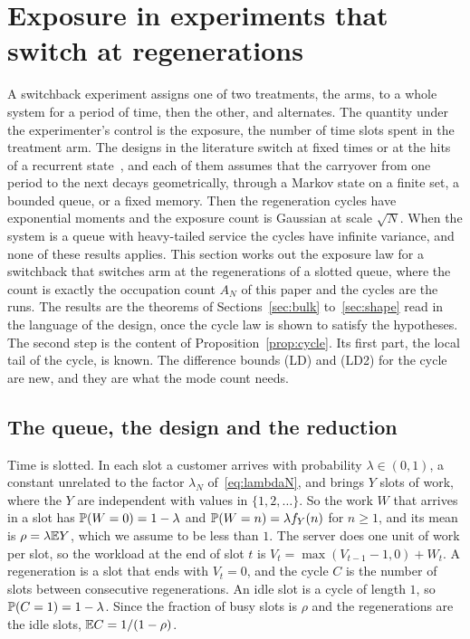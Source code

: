 \section{Exposure in experiments that switch at regenerations}\label{sec:exposure}

A switchback experiment assigns one of two treatments, the arms, to a whole system for a
period of time, then the other, and alternates. The quantity under the experimenter's
control is the exposure, the number of time slots spent in the treatment arm. The designs
in the literature switch at fixed times or at the hits of a recurrent
state~\cite{bsz2023,huwager2022,gjr2020,ljkw2023,jky2023,hu2026}, and each of them assumes
that the carryover from one period to the next decays geometrically, through a Markov
state on a finite set, a bounded queue, or a fixed memory. Then the regeneration cycles
have exponential moments and the exposure count is Gaussian at scale $\sqrt N$. When the
system is a queue with heavy-tailed service the cycles have infinite variance, and none of
these results applies. This section works out the exposure law for a switchback that
switches arm at the regenerations of a slotted queue, where the count is exactly the
occupation count $A_N$ of this paper and the cycles are the runs. The results are the
theorems of Sections~\ref{sec:bulk} to~\ref{sec:shape} read in the language of the design,
once the cycle law is shown to satisfy the hypotheses. The second step is the content of
Proposition~\ref{prop:cycle}. Its first part, the local tail of the cycle, is known. The
difference bounds (LD) and (LD2) for the cycle are new, and they are what the mode count
needs.

\subsection{The queue, the design and the reduction}\label{sec:exposure-model}

Time is slotted. In each slot a customer arrives with probability $\lambda\in(0,1)$, a
constant unrelated to the factor $\lambda_N$ of~\eqref{eq:lambdaN}, and brings $Y$ slots of
work, where the $Y$ are independent with values in $\{1,2,\dots\}$. So the work $W$ that
arrives in a slot has $\mathbb{P}(W=0)=1-\lambda$ and $\mathbb{P}(W=n)=\lambda f_Y(n)$ for $n\ge1$, and
its mean is $\rho=\lambda\mathbb{E} Y$, which we assume to be less than $1$. The server does one unit
of work per slot, so the workload at the end of slot $t$ is
$V_t=\max(V_{t-1}-1,0)+W_t$. A regeneration is a slot that ends with $V_t=0$, and the cycle
$C$ is the number of slots between consecutive regenerations. An idle slot is a cycle of
length $1$, so $\mathbb{P}(C=1)=1-\lambda$. Since the fraction of busy slots is $\rho$ and the
regenerations are the idle slots, $\mathbb{E} C=1/(1-\rho)$.

